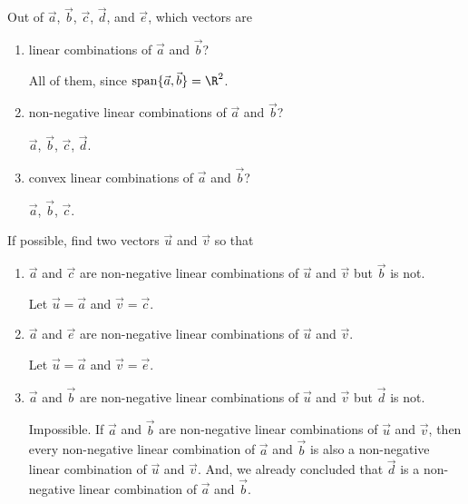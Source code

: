 \documentclass{problemset}
\DeclareMathOperator{\Span}{span}
\begin{document}
	\begin{parts}
		\item Out of $\vec a$, $\vec b$, $\vec c$, $\vec d$, and $\vec e$, which
			vectors are
			\begin{enumerate}
				\item linear combinations of $\vec a$ and $\vec b$?
				\begin{solution}[inline]
					All of them, since $\Span\{\vec a,\vec b\}=\R^2$.
				\end{solution}

				\item non-negative linear combinations of $\vec a$ and $\vec b$?
				\begin{solution}[inline]
					$\vec a$, $\vec b$, $\vec c$, $\vec d$.
				\end{solution}

				\item convex linear combinations of $\vec a$ and $\vec b$?
				\begin{solution}[inline]
					$\vec a$, $\vec b$, $\vec c$.
				\end{solution}
			\end{enumerate}

		\item If possible, find two vectors $\vec u$ and $\vec v$ so that
			\begin{enumerate}
				\item $\vec a$ and $\vec c$ are non-negative linear combinations
					of $\vec u$ and $\vec v$ but $\vec b$ is not.
				\begin{solution}
					Let $\vec u=\vec a$ and $\vec v=\vec c$.
				\end{solution}

				\item $\vec a$ and $\vec e$ are non-negative linear combinations
					of $\vec u$ and $\vec v$.
				\begin{solution}
					Let $\vec u=\vec a$ and $\vec v=\vec e$.
				\end{solution}

				\item $\vec a$ and $\vec b$ are non-negative linear combinations
					of $\vec u$ and $\vec v$ but $\vec d$ is not.
				\begin{solution}
					Impossible. If $\vec a$ and $\vec b$ are non-negative
					linear combinations of $\vec u$ and $\vec v$, then every non-negative
					linear combination of $\vec a$ and $\vec b$ is also a non-negative
					linear combination of $\vec u$ and $\vec v$. And, we already concluded that
					$\vec d$ is a non-negative linear combination of $\vec a$ and $\vec b$.
				\end{solution}


\end{enumerate}
\end{parts}
\end{document}
